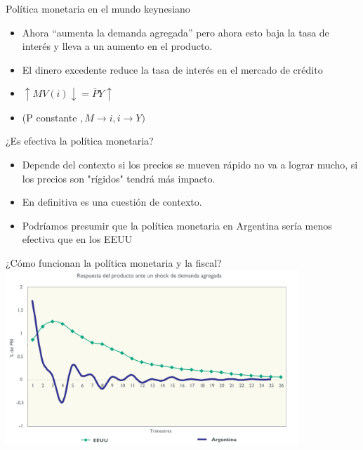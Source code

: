 \documentclass{beamer}
\begin{document}
\begin{frame}{Política monetaria en el mundo keynesiano}
    \begin{itemize}
        \item Ahora “aumenta la demanda agregada” pero ahora esto baja la tasa de interés y lleva a un aumento en el producto.
        \item El dinero excedente reduce la tasa de interés en el mercado de crédito
       \item $\uparrow M V(i) \downarrow=\bar{P} Y \uparrow$
       \item (P constante $, M \rightarrow i, i \rightarrow Y)$
    \end{itemize}
\end{frame}

\begin{frame}{¿Es efectiva la política monetaria?}
    \begin{itemize}
        \item Depende del contexto si los precios se mueven rápido no va a lograr mucho, si los precios son "rígidos" tendrá más impacto. 
        \item En definitiva es una cuestión de contexto.
        \item Podríamos presumir que la política monetaria en Argentina sería menos efectiva que en los EEUU
    \end{itemize}
\end{frame}

\begin{frame}{¿Cómo funcionan la política monetaria y la fiscal?}
    \centering\includegraphics[width=11cm]{P81.png}\
\end{frame}
\end{document}
